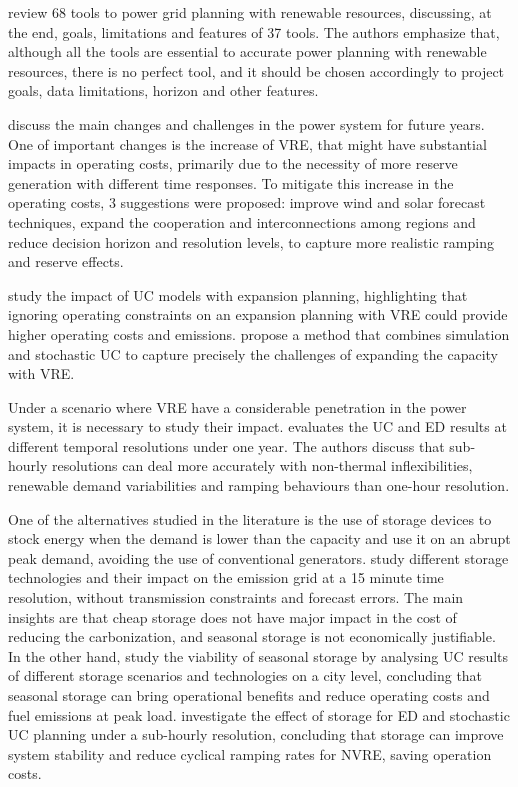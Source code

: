 \documentclass[12pt,LUDisStyle,twosided]{book}
\begin{document}
\citeauthor{connolly} \cite{connolly} review 68 tools to power grid planning with renewable resources, discussing, at the end, goals, limitations and features of 37 tools. The authors emphasize that, although all the tools are essential to accurate power planning with renewable resources, there is no perfect tool, and it should be chosen accordingly to project goals, data limitations, horizon and other features. 


\citeauthor{kassakian} \cite{kassakian} discuss the main changes and challenges in the power system for future years. One of important changes is the increase of VRE, that might have substantial impacts in operating costs, primarily due to the necessity of more reserve generation with different time responses. To mitigate this increase in the operating costs, 3 suggestions were proposed: improve wind and solar forecast techniques, expand the cooperation and interconnections among regions and reduce decision horizon and resolution levels, to capture more realistic ramping and reserve effects.

\citeauthor{palmintier} \cite{palmintier} study the impact of UC models with expansion planning, highlighting that ignoring operating constraints on an expansion planning with VRE could provide higher operating costs and emissions. \citeauthor{hargreaves}  \cite{hargreaves} propose a method that combines simulation and stochastic UC to capture precisely the challenges of expanding the capacity with VRE.

Under a scenario where VRE have a considerable penetration in the power system, it is necessary to study their impact. \citeauthor{deane} \cite{deane} evaluates the UC and ED results at different temporal resolutions under one year. The authors discuss that sub-hourly resolutions can deal more accurately with non-thermal inflexibilities, renewable demand variabilities and ramping behaviours than one-hour resolution. 

One of the alternatives studied in the literature is the use of storage devices to stock energy when the demand is lower than the capacity and use it on an abrupt peak demand, avoiding the use of conventional generators.  \citeauthor{safaei} \cite{safaei} study different storage technologies and their impact on the emission grid at a 15 minute time resolution, without transmission constraints and forecast errors. The main insights are that cheap storage does not have major impact in the cost of reducing the carbonization, and seasonal storage is not economically justifiable. In the other hand, \citeauthor{harris} \cite{harris} study the viability of seasonal storage by analysing UC results of different storage scenarios and technologies on a city level, concluding that seasonal storage can bring operational benefits and reduce operating costs and fuel emissions at peak load. \citeauthor{dwyer} \cite{dwyer} investigate the effect of storage for ED and stochastic UC planning under a sub-hourly resolution, concluding that storage can improve system stability and reduce cyclical ramping rates for NVRE, saving operation costs. 
\end{document}
